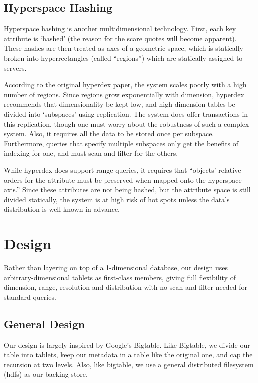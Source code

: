 \documentclass[11pt]{article}
\begin{document}
\subsection{Hyperspace Hashing}

Hyperspace hashing is another multidimensional technology. First, each key attribute is `hashed' (the reason for the scare quotes will become apparent). These hashes are then treated as axes of a geometric space, which is statically broken into hyperrectangles (called ``regions'') which are statically assigned to servers.\cite{hh}

According to the original hyperdex paper, the system scales poorly with a high number of regions. Since regions grow exponentially with dimension, hyperdex recommends that dimen\-sionality be kept low, and high-dimension tables be divided into `subspaces' using replication. The system does offer transactions in this replication, though one must worry about the robustness of such a complex system. Also, it requires all the data to be stored once per subspace. Furthermore, queries that specify multiple subspaces only get the benefits of indexing for one, and must scan and filter for the others.

While hyperdex does support range queries, it requires that ``objects' relative orders for the attribute must be preserved when mapped onto the hyperspace axis.'' Since these attributes are not being hashed, but the attribute space is still divided statically, the system is at high risk of hot spots unless the data's distribution is well known in advance.

\section{Design}

Rather than layering on top of a 1-dimensional database, our design uses arbitrary-dimensional tablets as first-class members, giving full flexibility of dimension, range, resolution and distribution with no scan-and-filter needed for standard queries.

\subsection{General Design}

Our design is largely inspired by Google's Bigtable\cite{bigtable}. Like Bigtable, we divide our table into tablets, keep our metadata in a table like the original one, and cap the recursion at two levels. Also, like bigtable, we use a general distributed filesystem (hdfs) as our backing store.
\end{document}
